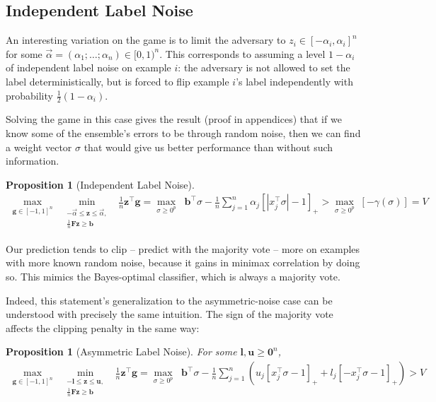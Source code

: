 \documentclass{colt2015} %
\newtheorem{prop}[thm]{Proposition}
\newcommand{\vF}{\mathbf{F}}
\newcommand{\vb}{\mathbf{b}}
\newcommand{\vu}{\mathbf{u}}
\newcommand{\vl}{\mathbf{l}}
\newcommand{\vg}{\mathbf{g}}
\newcommand{\vz}{\mathbf{z}}
\newcommand{\valpha}{\vec{\alpha}}
\newcommand{\vzero}{\mathbf{0}}
\newcommand{\abs}[1]{\left| #1 \right|}
\newcommand{\lrp}[1]{\left(#1\right)}
\begin{document}
\subsection{Independent Label Noise}

An interesting variation on the game is to limit the adversary to 
$z_i \in [-\alpha_i,\alpha_i]^n$ for some $\vec{\alpha} = (\alpha_1 ; \dots ; \alpha_n) \in [0,1)^n$. 
This corresponds to assuming a level $1 - \alpha_i$ of independent label noise on example $i$: 
the adversary is not allowed to set the label deterministically, 
but is forced to flip example $i$'s label independently 
with probability $\frac{1}{2}(1 - \alpha_i)$. 

Solving the game in this case gives the result (proof in appendices) 
that if we know some of the ensemble's errors to be through random noise, 
then we can find a weight vector $\sigma$ that would give us better performance than 
without such information. 
\begin{prop}[Independent Label Noise]
\label{prop:labnoise}
\begin{align*}
\max_{\vg \in [-1,1]^n} \;\;\min_{\substack{ - \valpha \leq \vz \leq \valpha , \\ 
\frac{1}{n} \vF \vz \geq \vb }} \;\; \frac{1}{n} \vz{^\top} \vg 
= \max_{\sigma \geq 0^p } \;\;\vb^\top \sigma - \frac{1}{n} \sum_{j=1}^n \alpha_j \left[ \abs{x_{j}^\top \sigma} - 1 \right]_{+}
> \max_{\sigma \geq 0^p } \;[- \gamma (\sigma)]
= V 
\end{align*}
\end{prop}
Our prediction tends to clip -- predict with the majority vote -- more on examples with more known random noise, 
because it gains in minimax correlation by doing so. 
This mimics the Bayes-optimal classifier, which is always a majority vote. 

Indeed, this statement's generalization to the asymmetric-noise case 
can be understood with precisely the same intuition. 
The sign of the majority vote affects the clipping penalty in the same way:
\begin{prop}[Asymmetric Label Noise] 
For some $\vl, \vu \geq \vzero^n$,
\begin{align*}
\max_{\vg \in [-1,1]^n} \;\;\min_{\substack{ -\vl \leq \vz \leq \vu , \\ 
\frac{1}{n} \vF \vz \geq \vb }} \;\; \frac{1}{n} \vz{^\top} \vg 
= \max_{\sigma \geq 0^p } \;\;\vb^\top \sigma - \frac{1}{n} \sum_{j=1}^n \lrp{ u_j \left[ x_{j}^\top \sigma - 1 \right]_{+} + l_j \left[ - x_{j}^\top \sigma - 1 \right]_{+} }
> V 
\end{align*}
\end{prop}
\end{document}
